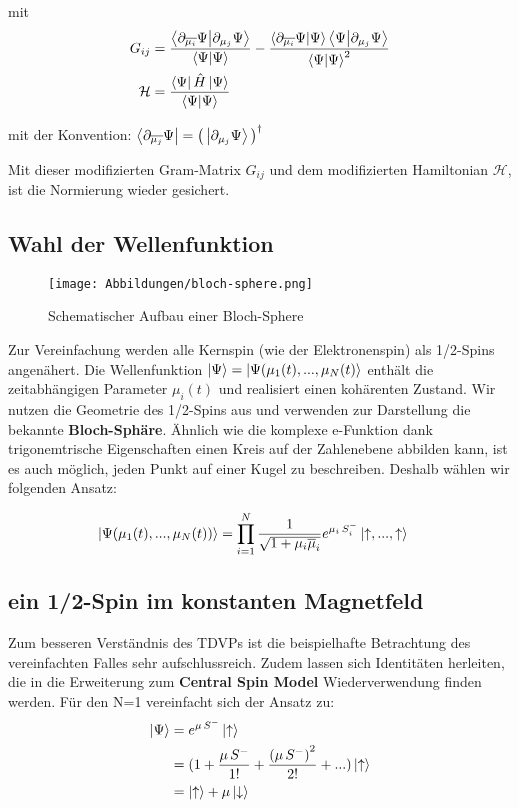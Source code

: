 \documentclass[12pt]{article}
\def\N{\bra{\Psi}\ket{\Psi}}
\def\muk{\overline{\mu}}
\begin{document}
mit 
\begin{align}
    G_{ij} &= \frac{\bra{\partial_{\overline{\mu_i}}\Psi}\ket{\partial_{\mu_j}\Psi}}{\N} 
    - \frac{\bra{\partial_{\overline{\mu_i}}\Psi}\ket{\Psi}\bra{\Psi}\ket{\partial_{\mu_j}\Psi}}{\N^2} \\
    \mathcal{H} &= \frac{\bra{\Psi}\hat{H}\ket{\Psi}}{\N}
\end{align}

\noindent mit der Konvention: $\bra{\partial_{\overline{\mu_j}}\Psi} = \left(\thinspace\ket{\partial_{\mu_j}\Psi}\thinspace\right)^\dagger$

\noindent Mit dieser modifizierten Gram-Matrix $G_{ij}$ und dem modifizierten Hamiltonian $\mathcal{H}$, ist die Normierung wieder 
gesichert. 


\subsection{Wahl der Wellenfunktion}
\begin{wrapfigure}{r}{0.4\textwidth}
    \centering
    \texttt{[image: Abbildungen/bloch-sphere.png]}
    \caption{Schematischer Aufbau einer Bloch-Sphere}
    \label{fig:qubit}
\end{wrapfigure}
Zur Vereinfachung werden alle Kernspin (wie der Elektronenspin) als 1/2-Spins angenähert. 
Die Wellenfunktion $\ket{\Psi}=\ket{\Psi(\mu_1(t),...,\mu_N(t)}$ enthält die zeitabhängigen Parameter $\mu_i(t)$ und realisiert einen 
kohärenten Zustand. Wir nutzen die Geometrie des 1/2-Spins aus und verwenden zur Darstellung die bekannte \textbf{Bloch-Sphäre}. 
Ähnlich wie die komplexe e-Funktion dank trigonemtrische Eigenschaften einen Kreis auf der Zahlenebene abbilden kann, ist es auch möglich,
 jeden Punkt auf einer Kugel zu beschreiben. Deshalb wählen wir folgenden Ansatz:

\begin{align}
    \ket{\Psi(\mu_1(t),...,\mu_N(t))} &= \prod_{i=1}^{N} \frac{1}{\sqrt{1+\mu_i\muk_i}}e^{\mu_i\thinspace S_i^-}\ket{\uparrow,...,\uparrow}
\end{align}

\subsection{ein 1/2-Spin im konstanten Magnetfeld}
Zum besseren Verständnis des TDVPs ist die beispielhafte Betrachtung des vereinfachten Falles sehr aufschlussreich. 
Zudem lassen sich Identitäten herleiten, die in die Erweiterung zum \textbf{Central Spin Model} Wiederverwendung finden werden.
Für den N=1 vereinfacht sich der Ansatz zu:
\begin{align*}
    \ket{\Psi} &= e^{\mu\thinspace S^-}\ket{\uparrow} \\
            &= (1 + \frac{\mu\thinspace S^{-}}{1!} + \frac{\left(\mu\thinspace S^{-}\right)^2}{2!} + ...)\ket{\uparrow}    \\
            &= \ket{\uparrow} + \mu\ket{\downarrow}
\end{align*}
\end{document}
